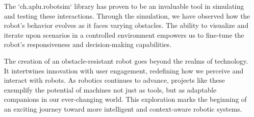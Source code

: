 The `ch.aplu.robotsim` library has proven to be an invaluable tool in simulating and testing these interactions. Through the simulation, we have observed how the robot's behavior evolves as it faces varying obstacles. The ability to visualize and iterate upon scenarios in a controlled environment empowers us to fine-tune the robot's responsiveness and decision-making capabilities.

The creation of an obstacle-resistant robot goes beyond the realms of technology. It intertwines innovation with user engagement, redefining how we perceive and interact with robots. As robotics continues to advance, projects like these exemplify the potential of machines not just as tools, but as adaptable companions in our ever-changing world. This exploration marks the beginning of an exciting journey toward more intelligent and context-aware robotic systems.